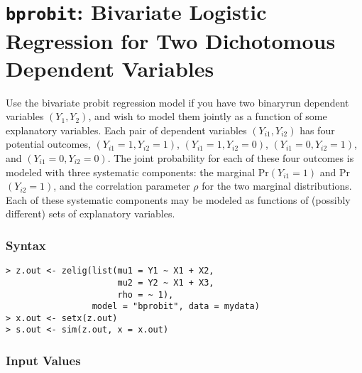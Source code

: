 \section{{\tt bprobit}: Bivariate Logistic Regression for Two
Dichotomous Dependent Variables}\label{bprobit}

Use the bivariate probit regression model if you have two binaryrun
dependent variables $(Y_1, Y_2)$, and wish to model them jointly as a
function of some explanatory variables.  Each pair of dependent
variables $(Y_{i1}, Y_{i2})$ has four potential outcomes, $(Y_{i1}=1,
Y_{i2}=1)$, $(Y_{i1}=1, Y_{i2}=0)$, $(Y_{i1}=0, Y_{i2}=1)$, and
$(Y_{i1}=0, Y_{i2}=0)$.  The joint probability for each of these four
outcomes is modeled with three systematic components: the marginal
Pr$(Y_{i1} = 1)$ and Pr$(Y_{i2} = 1)$, and the correlation parameter
$\rho$ for the two marginal distributions.  Each of these systematic
components may be modeled as functions of (possibly different) sets of
explanatory variables.

\subsubsection{Syntax}

\begin{verbatim}
> z.out <- zelig(list(mu1 = Y1 ~ X1 + X2, 
                      mu2 = Y2 ~ X1 + X3,
                      rho = ~ 1),
                 model = "bprobit", data = mydata)
> x.out <- setx(z.out)
> s.out <- sim(z.out, x = x.out)
\end{verbatim}

\subsubsection{Input Values}

